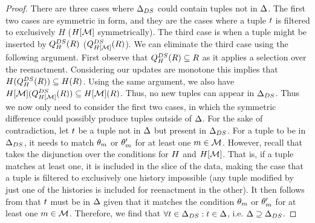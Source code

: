 \begin{proof}
\proofpar{$\dfull \supseteq \dslice$} There are three cases where $\Delta_{DS}$ could contain tuples not in $\Delta$. The first two cases are symmetric in form, and they are the cases where a tuple $t$ is filtered to exclusively $H$ ($H[\mathcal{M}]$ symmetrically). The third case is when a tuple might be inserted by $Q_{H}^{DS}(R)$ ($Q_{H[\mathcal{M}]}^{DS}(R)$).
We can eliminate the third case using the following argument. First observe that $Q_{H}^{DS}(R) \subseteq R$ as it applies a selection over the reenactment. Considering our updates are monotone this implies that $H(Q_{H}^{DS}(R)) \subseteq H(R)$. Using the same argument, we also have $H[\mathcal{M}](Q_{H[\mathcal{M}]}^{DS}(R)) \subseteq H[\mathcal{M}](R)$. Thus, no new tuples can appear in $\Delta_{DS}$.
  Thus we now only need to consider the first two cases, in which the symmetric difference could possibly produce tuples outside of $\Delta$. For the sake of contradiction, let $t$ be a tuple not in $\Delta$ but present in $\Delta_{DS}$. For a tuple to be in $\Delta_{DS}$, it needs to match $\theta_m$ or $\theta_m'$ for at least one $m \in \mathcal{M}$. However, recall that  takes the disjunction over the conditions for $H$ and $H[\mathcal{M}]$. That is, if a tuple matches at least one, it is included in the slice of the data, making the case that a tuple is filtered to exclusively one history impossible (any tuple modified by just one of the histories is included for reenactment in the other). It then follows from  that $t$ must be in $\Delta$ given that it matches the condition $\theta_m$ or $\theta_m'$ for at least one $m \in \mathcal{M}$. Therefore, we find that $\forall t \in \Delta_{DS}: t \in \Delta$, i.e. $\dfull \supseteq \dslice$.

\end{proof}



